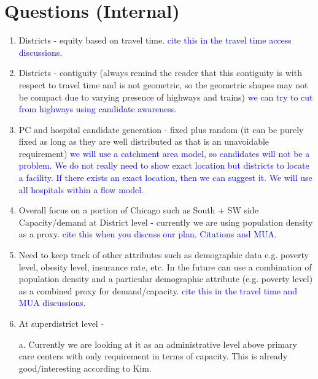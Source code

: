 \documentclass[11pt]{article}
\begin{document}

\section*{Questions (Internal)}

\begin{enumerate}
    \item \label{q1} Districts - equity based on travel time. \textcolor{blue}{cite this in the travel time access discussions.}

    \item \label{q2} Districts - contiguity (always remind the reader that this contiguity is with respect to travel time and is not geometric, so the geometric shapes may not be compact due to varying presence of highways and trains) \textcolor{blue}{we can try to cut from highways using candidate awareness.}

    \item \label{q3} PC and hospital candidate generation  - fixed plus random (it can be purely fixed as long as they are well distributed as that is an unavoidable requirement)
    \textcolor{blue}{we will use a catchment area model, so candidates will not be a problem. We do not really need to show exact location but districts to locate a facility. If there exists an exact location, then we can suggest it. We will use all hospitals within a flow model.}

    \item \label{q4} Overall focus on a portion of Chicago such as South + SW side Capacity/demand at District level - currently we are using population density as a proxy. \textcolor{blue}{cite this when you discuss our plan. Citations and MUA.}

    \item \label{q5} Need to keep track of other attributes such as demographic data e.g. poverty level, obesity level, insurance rate, etc. In the future can use a combination of population density and a particular demographic attribute (e.g. poverty level) as  a combined proxy for demand/capacity. \textcolor{blue}{cite this in the travel time and MUA discussions.}

    \item \label{q6} At superdistrict level -

    \subitem a. Currently we are looking at it as an administrative level above primary care centers with only requirement in terms of capacity. This is already good/interesting according to Kim.


\end{enumerate}
\end{document}
